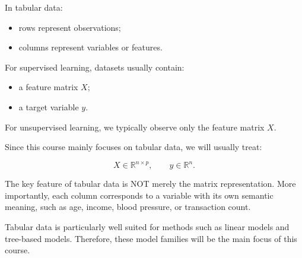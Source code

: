 \documentclass[
  letterpaper,
  DIV=11,
  numbers=noendperiod]{scrreprt}
\providecommand{\tightlist}{%
  \setlength{\itemsep}{0pt}\setlength{\parskip}{0pt}}
\theoremstyle{definition}
\theoremstyle{definition}
\theoremstyle{plain}
\theoremstyle{plain}
\theoremstyle{remark}
\begin{document}
In tabular data:

\begin{itemize}
\tightlist
\item
  rows represent observations;
\item
  columns represent variables or features.
\end{itemize}

For supervised learning, datasets usually contain:

\begin{itemize}
\tightlist
\item
  a feature matrix \(X\);
\item
  a target variable \(y\).
\end{itemize}

For unsupervised learning, we typically observe only the feature matrix
\(X\).

Since this course mainly focuses on tabular data, we will usually treat:

\[
X \in \mathbb{R}^{n \times p},
\qquad
y \in \mathbb{R}^n.
\]

\begin{tcolorbox}[enhanced jigsaw, arc=.35mm, bottomrule=.15mm, bottomtitle=1mm, breakable, colback=white, colbacktitle=quarto-callout-caution-color!10!white, colframe=quarto-callout-caution-color-frame, coltitle=black, left=2mm, leftrule=.75mm, opacityback=0, opacitybacktitle=0.6, rightrule=.15mm, title=\textcolor{quarto-callout-caution-color}{\faFire}\hspace{0.5em}{columns correspond to variables}, titlerule=0mm, toprule=.15mm, toptitle=1mm]

The key feature of tabular data is NOT merely the matrix representation.
More importantly, each column corresponds to a variable with its own
semantic meaning, such as age, income, blood pressure, or transaction
count.

\end{tcolorbox}

\begin{tcolorbox}[enhanced jigsaw, arc=.35mm, bottomrule=.15mm, bottomtitle=1mm, breakable, colback=white, colbacktitle=quarto-callout-tip-color!10!white, colframe=quarto-callout-tip-color-frame, coltitle=black, left=2mm, leftrule=.75mm, opacityback=0, opacitybacktitle=0.6, rightrule=.15mm, title=\textcolor{quarto-callout-tip-color}{\faLightbulb}\hspace{0.5em}{Tip}, titlerule=0mm, toprule=.15mm, toptitle=1mm]

Tabular data is particularly well suited for methods such as linear
models and tree-based models. Therefore, these model families will be
the main focus of this course.

\end{tcolorbox}
\end{document}
